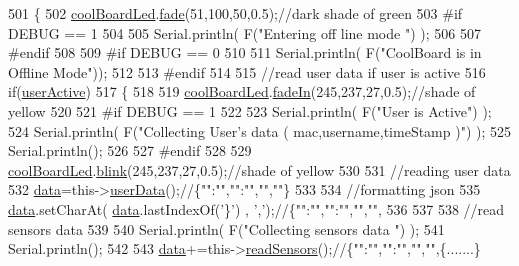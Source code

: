 \begin{DoxyCode}
501 \{
502     \hyperlink{class_cool_board_a1b1d3c684a5baa56b08486e192fd8e97}{coolBoardLed}.\hyperlink{class_cool_board_led_af1cacbaa88db8bcf6042c1083ba41155}{fade}(51,100,50,0.5);\textcolor{comment}{//dark shade of green  }
503 \textcolor{preprocessor}{#if DEBUG == 1  }
504     
505     Serial.println( F(\textcolor{stringliteral}{"Entering off line mode "}) ); 
506     
507 \textcolor{preprocessor}{#endif}
508 
509 \textcolor{preprocessor}{#if DEBUG == 0}
510 
511     Serial.println( F(\textcolor{stringliteral}{"CoolBoard is in Offline Mode"}));
512 
513 \textcolor{preprocessor}{#endif}
514 
515     \textcolor{comment}{//read user data if user is active}
516     \textcolor{keywordflow}{if}(\hyperlink{class_cool_board_a6395459131d6889a3005f79c7a35e964}{userActive})
517     \{
518 
519         \hyperlink{class_cool_board_a1b1d3c684a5baa56b08486e192fd8e97}{coolBoardLed}.\hyperlink{class_cool_board_led_ab778f5e7bed0ab74e3906d82110493c3}{fadeIn}(245,237,27,0.5);\textcolor{comment}{//shade of yellow}
520 
521 \textcolor{preprocessor}{    #if DEBUG == 1}
522         
523         Serial.println( F(\textcolor{stringliteral}{"User is Active"}) );
524         Serial.println( F(\textcolor{stringliteral}{"Collecting User's data ( mac,username,timeStamp )"}) );
525         Serial.println();
526 
527 \textcolor{preprocessor}{    #endif}
528 
529         \hyperlink{class_cool_board_a1b1d3c684a5baa56b08486e192fd8e97}{coolBoardLed}.\hyperlink{class_cool_board_led_a96e1ea13003eee34c9dbcef340404426}{blink}(245,237,27,0.5);\textcolor{comment}{//shade of yellow   }
530 
531         \textcolor{comment}{//reading user data}
532         \hyperlink{class_cool_board_a427fb753dd8575bdf821c70a5c63d695}{data}=this->\hyperlink{class_cool_board_ae7358fb6e623cfc81b775f5f1734909b}{userData}();\textcolor{comment}{//\{"":"","":"","",""\}}
533 
534         \textcolor{comment}{//formatting json }
535         \hyperlink{class_cool_board_a427fb753dd8575bdf821c70a5c63d695}{data}.setCharAt( \hyperlink{class_cool_board_a427fb753dd8575bdf821c70a5c63d695}{data}.lastIndexOf(\textcolor{charliteral}{'\}'}) , \textcolor{charliteral}{','});\textcolor{comment}{//\{"":"","":"","","",}
536         
537                 
538         \textcolor{comment}{//read sensors data}
539 
540         Serial.println( F(\textcolor{stringliteral}{"Collecting sensors data "}) );
541         Serial.println();
542 
543         \hyperlink{class_cool_board_a427fb753dd8575bdf821c70a5c63d695}{data}+=this->\hyperlink{class_cool_board_ad03abdce2e65f520bbf2cff0f2d083cf}{readSensors}();\textcolor{comment}{//\{"":"","":"","","",\{.......\}}

\end{DoxyCode}
